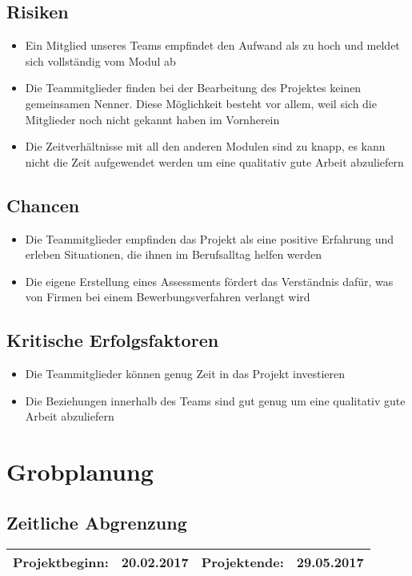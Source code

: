 \subsection{Risiken}
\begin{itemize}
\item Ein Mitglied unseres Teams empfindet den Aufwand als zu hoch und meldet sich vollständig vom Modul ab
\item Die Teammitglieder finden bei der Bearbeitung des Projektes keinen gemeinsamen Nenner. Diese Möglichkeit besteht vor allem, weil sich die Mitglieder noch nicht gekannt haben im Vornherein
\item Die Zeitverhältnisse mit all den anderen Modulen sind zu knapp, es kann nicht die Zeit aufgewendet werden um eine qualitativ gute Arbeit abzuliefern
\end{itemize}
\subsection{Chancen}
\begin{itemize}
\item Die Teammitglieder empfinden das Projekt als eine positive Erfahrung und erleben Situationen, die ihnen im Berufsalltag helfen werden
\item Die eigene Erstellung eines Assessments fördert das Verständnis dafür, was von Firmen bei einem Bewerbungsverfahren verlangt wird
\end{itemize}
\subsection{Kritische Erfolgsfaktoren}
\begin{itemize}
\item Die Teammitglieder können genug Zeit in das Projekt investieren
\item Die Beziehungen innerhalb des Teams sind gut genug um eine qualitativ gute Arbeit abzuliefern
\end{itemize}

\section{Grobplanung}

\subsection{Zeitliche Abgrenzung}\label{Abgrenzung}
\begin{tabular}{ | l | l | l | l |}
    \hline
    Projektbeginn: & 20.02.2017 & Projektende: & 29.05.2017  \\ \hline
\end{tabular}

